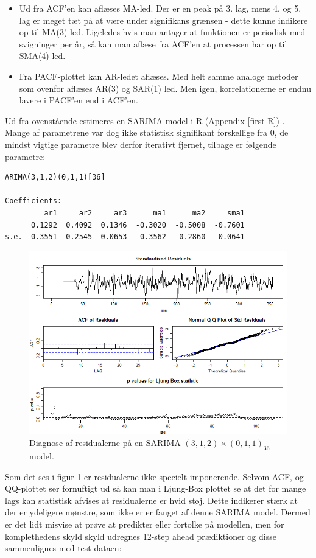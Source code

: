 \begin{itemize}
\item Ud fra ACF'en kan aflæses MA-led. Der er en peak på 3. lag, mens 4. og 5. lag er meget tæt på at være under signifikans grænsen -  dette kunne indikere op til MA(3)-led.
Ligeledes hvis man antager at funktionen er periodisk med svigninger per år, så kan man aflæse fra ACF'en at processen har op til SMA(4)-led.

\item Fra PACF-plottet kan AR-ledet aflæses. Med helt samme analoge metoder som ovenfor aflæses AR(3) og SAR(1) led.
Men igen, korrelationerne er endnu lavere i PACF'en end i ACF'en. 
\end{itemize}

Ud fra ovenstående estimeres en SARIMA model i R (Appendix \ref{first-R}) .
Mange af parametrene var dog ikke statistisk signifikant forskellige fra 0, de mindst vigtige parametre blev derfor iterativt fjernet, tilbage er følgende parametre:
\begin{lstlisting}
ARIMA(3,1,2)(0,1,1)[36]                    

Coefficients:
         ar1     ar2     ar3      ma1      ma2     sma1
      0.1292  0.4092  0.1346  -0.3020  -0.5008  -0.7601
s.e.  0.3551  0.2545  0.0653   0.3562   0.2860   0.0641
\end{lstlisting}

\begin{figure}[H]
\centering
\includegraphics[width=\textwidth]{figures/tsDiagnostics}
\caption{Diagnose af residualerne på en SARIMA $(3,1,2) \times (0,1,1)_{36}$ model.}
\label{fig:ts-tsdiag}
\end{figure}
Som det ses i figur \ref{fig:ts-tsdiag} er residualerne ikke specielt imponerende.
Selvom ACF, og QQ-plottet ser fornuftigt ud så kan man i Ljung-Box plottet se at det for mange lags kan statistisk afvises at residualerne er hvid støj.
Dette indikerer stærk at der er ydeligere mønstre, som ikke er er fanget af denne SARIMA model.
Dermed er det lidt misvise at prøve at predikter eller fortolke på modellen,
men for komplethedens skyld skyld udregnes 12-step ahead prædiktioner og disse sammenlignes med test dataen:

